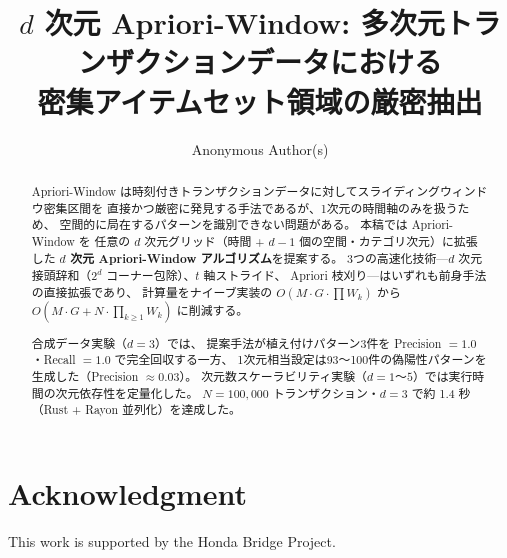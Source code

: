 \documentclass[sigconf,natbib=true]{acmart}
\begin{document}
\title{$d$ 次元 Apriori-Window: 多次元トランザクションデータにおける\\
密集アイテムセット領域の厳密抽出}

\author{Anonymous Author(s)}

\begin{abstract}
Apriori-Window は時刻付きトランザクションデータに対してスライディングウィンドウ密集区間を
直接かつ厳密に発見する手法であるが、1次元の時間軸のみを扱うため、
空間的に局在するパターンを識別できない問題がある。
本稿では Apriori-Window を
任意の $d$ 次元グリッド（時間 + $d{-}1$ 個の空間・カテゴリ次元）に拡張した
\textbf{$d$ 次元 Apriori-Window アルゴリズム}を提案する。
3つの高速化技術---$d$ 次元接頭辞和（$2^d$ コーナー包除）、$t$ 軸ストライド、
Apriori 枝刈り---はいずれも前身手法の直接拡張であり、
計算量をナイーブ実装の $O\!\left(M \cdot G \cdot \prod W_k\right)$ から
$O\!\left(M \cdot G + N \cdot \prod_{k\geq1} W_k\right)$ に削減する。

合成データ実験（$d{=}3$）では、
提案手法が植え付けパターン3件を Precision $= 1.0$・Recall $= 1.0$ で完全回収する一方、
1次元相当設定は93〜100件の偽陽性パターンを生成した（Precision $\approx 0.03$）。
次元数スケーラビリティ実験（$d{=}1$〜$5$）では実行時間の次元依存性を定量化した。
$N = 100{,}000$ トランザクション・$d{=}3$ で約 1.4 秒（Rust + Rayon 並列化）を達成した。
\end{abstract}


\maketitle








\section*{Acknowledgment}
This work is supported by the Honda Bridge Project.



\end{document}
